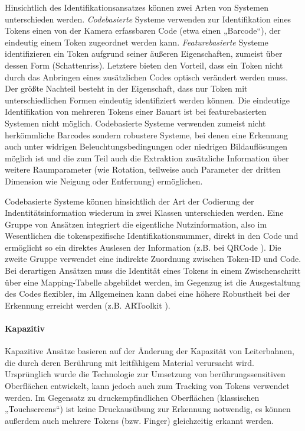 Hinsichtlich des Identifikationsansatzes können zwei Arten von Systemen unterschieden werden. \emph{Codebasierte} Systeme verwenden zur Identifikation eines Tokens einen von der Kamera erfassbaren Code (etwa einen „Barcode“), der eindeutig einem Token zugeordnet werden kann. \emph{Featurebasierte} Systeme identifizieren ein Token aufgrund seiner äußeren Eigenschaften, zumeist über dessen Form (Schattenriss). Letztere bieten den Vorteil, dass ein Token nicht durch das Anbringen eines zusätzlichen Codes optisch verändert werden muss. Der größte Nachteil besteht in der Eigenschaft, dass nur Token mit unterschiedlichen Formen eindeutig identifiziert werden können. Die eindeutige Identifikation von mehreren Tokens einer Bauart ist bei featurebasierten Systemen nicht möglich. Codebasierte Systeme verwenden zumeist nicht herkömmliche Barcodes sondern robustere Systeme, bei denen eine Erkennung auch unter widrigen Beleuchtungsbedingungen oder niedrigen Bildauflösungen möglich ist und die zum Teil auch die Extraktion zusätzliche Information über weitere Raumparameter (wie Rotation, teilweise auch Parameter der dritten Dimension wie Neigung oder Entfernung) ermöglichen. 

Codebasierte Systeme können hinsichtlich der Art der Codierung der Indentitätsinformation wiederum in zwei Klassen unterschieden werden. Eine Gruppe von Ansätzen integriert die eigentliche Nutzinformation, also im Wesentlichen die tokenspezifische Identifikationsnummer, direkt in den Code und ermöglicht so ein direktes Auslesen der Information (z.B. bei QRCode \citep{QR2008}). Die zweite Gruppe verwendet eine indirekte Zuordnung zwischen Token-ID und Code. Bei derartigen Ansätzen muss die Identität eines Tokens in einem Zwischenschritt über eine Mapping-Tabelle abgebildet werden, im Gegenzug ist die Ausgestaltung des Codes flexibler, im Allgemeinen kann dabei eine höhere Robustheit bei der Erkennung erreicht werden (z.B. ARToolkit \citep{Kato00}).


\paragraph{Kapazitiv} %
\label{par:kapazitiv}

Kapazitive Ansätze basieren auf der Änderung der Kapazität von Leiterbahnen, die durch deren Berührung mit leitfähigem Material verursacht wird. Ursprünglich wurde die Technologie zur Umsetzung von berührungssensitiven Oberflächen entwickelt, kann jedoch auch zum Tracking von Tokens verwendet werden. Im Gegensatz zu druckempfindlichen Oberflächen (klassischen „Touchscreens“) ist keine Druckausübung zur Erkennung notwendig, es können außerdem auch mehrere Tokens (bzw. Finger) gleichzeitig erkannt werden.

